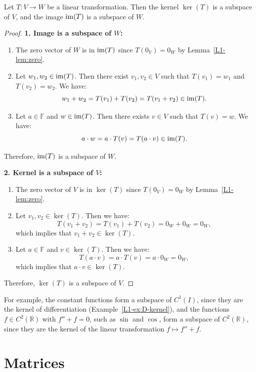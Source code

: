\begin{theorem}\label{L1-thm:kerim}
    Let $T: V \to W$ be a linear transformation. Then the kernel $\ker(T)$ is a subspace of $V$, and the image $\operatorname{im}(T)$ is a subspace of $W$.
\end{theorem}

\begin{proof}
    \textbf{1. Image is a subspace of $W$:}
    \begin{enumerate}
        \item The zero vector of $W$ is in $\operatorname{im}(T)$ since $T(0_V) = 0_W$ by Lemma~\ref{L1-lem:zero}.
        \item Let $w_1, w_2 \in \operatorname{im}(T)$. Then there exist $v_1, v_2 \in V$ such that $T(v_1) = w_1$ and $T(v_2) = w_2$. We have:
        \[w_1 + w_2 = T(v_1) + T(v_2) = T(v_1 + v_2) \in \operatorname{im}(T).\]
        \item Let $a \in \mathbb{F}$ and $w \in \operatorname{im}(T)$. Then there exists $v \in V$ such that $T(v) = w$. We have:
        \[a \cdot w = a \cdot T(v) = T(a \cdot v) \in \operatorname{im}(T).\]
    \end{enumerate}
    Therefore, $\operatorname{im}(T)$ is a subspace of $W$.

    \textbf{2. Kernel is a subspace of $V$:}
    \begin{enumerate}
        \item The zero vector of $V$ is in $\ker(T)$ since $T(0_V) = 0_W$ by Lemma~\ref{L1-lem:zero}.
        \item Let $v_1, v_2 \in \ker(T)$. Then we have:
        \[T(v_1 + v_2) = T(v_1) + T(v_2) = 0_W + 0_W = 0_W,\]
        which implies that $v_1 + v_2 \in \ker(T)$.
        \item Let $a \in \mathbb{F}$ and $v \in \ker(T)$. Then we have:
        \[T(a \cdot v) = a \cdot T(v) = a \cdot 0_W = 0_W,\]
        which implies that $a \cdot v \in \ker(T)$.
    \end{enumerate}
    Therefore, $\ker(T)$ is a subspace of $V$.
\end{proof}

For example, the constant functions form a subspace of $C^1(I)$, since they are the kernel of differentiation (Example~\ref{L1-ex:D-kernel}), and the functions $f \in C^2(\mathbb{R})$ with $f'' + f = 0$, such as $\sin$ and $\cos$, form a subspace of $C^2(\mathbb{R})$, since they are the kernel of the linear transformation $f \mapsto f'' + f$.

\section{Matrices}

